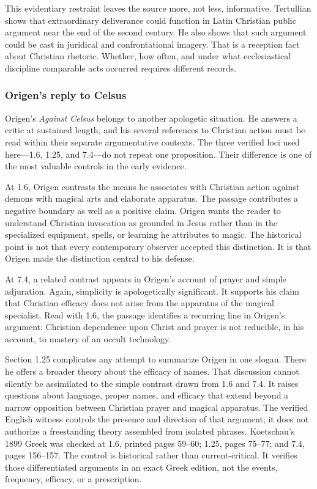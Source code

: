 This evidentiary restraint leaves the source more, not less, informative.
Tertullian shows that extraordinary deliverance could function in Latin
Christian public argument near the end of the second century. He also shows
that such argument could be cast in juridical and confrontational imagery.
That is a reception fact about Christian rhetoric. Whether, how often, and
under what ecclesiastical discipline comparable acts occurred requires
different records.

\subsubsection{Origen's reply to Celsus}

Origen's \emph{Against Celsus} belongs to another apologetic situation. He
answers a critic at sustained length, and his several references to Christian
action must be read within their separate argumentative contexts. The three
verified loci used here---1.6, 1.25, and 7.4---do not repeat one proposition.
Their difference is one of the most valuable controls in the early evidence.

At 1.6, Origen contrasts the means he associates with Christian action against
demons with magical arts and elaborate apparatus. The passage contributes a
negative boundary as well as a positive claim. Origen wants the reader to
understand Christian invocation as grounded in Jesus rather than in the
specialized equipment, spells, or learning he attributes to magic. The
historical point is not that every contemporary observer accepted this
distinction. It is that Origen made the distinction central to his defense.

At 7.4, a related contrast appears in Origen's account of prayer and simple
adjuration. Again, simplicity is apologetically significant. It supports his
claim that Christian efficacy does not arise from the apparatus of the magical
specialist. Read with 1.6, the passage identifies a recurring line in Origen's
argument: Christian dependence upon Christ and prayer is not reducible, in his
account, to mastery of an occult technology.

Section 1.25 complicates any attempt to summarize Origen in one slogan. There
he offers a broader theory about the efficacy of names. That discussion cannot
silently be assimilated to the simple contrast drawn from 1.6 and 7.4. It
raises questions about language, proper names, and efficacy that extend beyond
a narrow opposition between Christian prayer and magical apparatus. The
verified English witness controls the presence and direction of that argument;
it does not authorize a freestanding theory assembled from isolated phrases.
Koetschau's 1899 Greek was checked at 1.6, printed pages 59--60; 1.25,
pages 75--77; and 7.4, pages 156--157. The control is historical rather than
current-critical. It verifies those differentiated arguments in an exact
Greek edition, not the events, frequency, efficacy, or a prescription.


